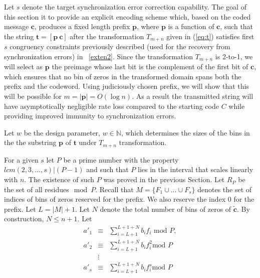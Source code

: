 Let $s$ denote the target synchronization error correction
capability. The goal of this section it to provide an explicit
encoding scheme which, based on the coded message $\mathbf{c}$,
produces a fixed length prefix $\mathbf{p}$, where $\mathbf{p}$ is
a function of $\mathbf{c}$, such that the string $\mathbf{t}=[
\mathbf{p} ~ \mathbf{c} ]$ after the transformation $T_{m+n}$
given in (\ref{eq:t}) satisfies first $s$ congruency constraints
previously described (used for the recovery from synchronization
errors) in ~\eqref{exten2}. Since the transformation $T_{m+n}$ is
2-to-1, we will select as $\mathbf{p}$ the preimage whose last bit
is the complement of the first bit of $\mathbf{c}$, which ensures
that no bin of zeros in the transformed domain spans both the
prefix and the codeword. Using judiciously chosen prefix, we will
show that this will be possible for $m=|\mathbf{p}|=O(\log n)$. As
a result the transmitted string will have asymptotically
negligible rate loss compared to the starting code $C$ while
providing improved immunity to synchronization errors.

Let $w$ be the design parameter, $w \in \mathbb{N}$, which
determines the sizes of the bins in the the substring $\mathbf{p}$
of $\mathbf{t}$ under
$T_{m+n}$ transformation. %




For a given $s$ let $P$ be a prime number with the property
$lcm(2,3,...,s)| (P-1)$ and such that $P$ lies in the interval
that scales linearly with $n$. The existence of such $P$ was
proved in the previous Section. Let $R_P$ be the set of all
residues$\mod P$. Recall that $M=\{F_1 \cup \dots \cup F_s \}$
denotes the set of indices of bins of zeros reserved for the
prefix. We also reserve the index $0$ for the prefix. Let
$L=|M|+1$. Let $N$ denote the total number of bins of zeros of
$\tilde{\mathbf{c}}$. By construction, $N \leq n+1$.
 Let
\begin{eqnarray}\label{code1} {a'}_1 &\equiv& \sum_{i=L+1}^{L+1+N} b_i f_i
\text{ mod } P, \\ {a'}_2 &\equiv& \sum_{i=L+1}^{L+1+N} b_i f_i^2
\text{
mod } P\\ &\vdots& \\
\label{codes}{a'}_s &\equiv& \sum_{i=L+1}^{L+1+N} b_i f_i^s \text{
mod } P\end{eqnarray}

